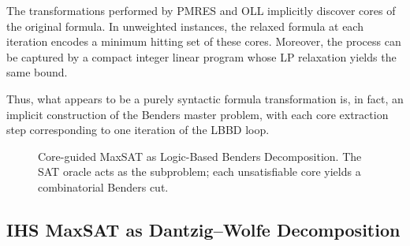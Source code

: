\begin{proposition}
The transformations performed by PMRES and OLL implicitly discover cores of the
original formula. In unweighted instances, the relaxed formula at each
iteration encodes a minimum hitting set of these cores. Moreover, the process
can be captured by a compact integer linear program whose LP relaxation yields
the same bound.
\end{proposition}

Thus, what appears to be a purely syntactic formula transformation is, in
fact, an implicit construction of the Benders master problem, with each core
extraction step corresponding to one iteration of the LBBD loop.

\begin{figure}[t]
\centering
{}
\caption{Core-guided MaxSAT as Logic-Based Benders Decomposition. The SAT oracle acts as the subproblem; each unsatisfiable core yields a combinatorial Benders cut.}
\label{fig:benders}
\end{figure}

\subsection{IHS MaxSAT as Dantzig--Wolfe Decomposition}
\label{sec:dw}

